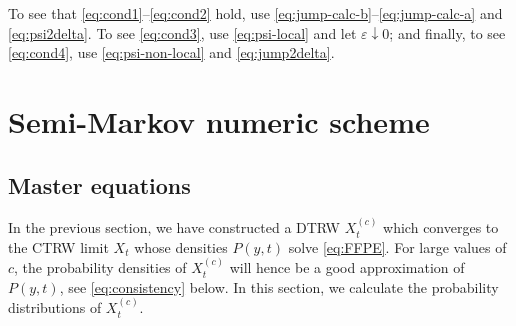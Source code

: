 \documentclass[a4paper,12pt]{elsarticle}
\numberwithin{equation}{section}
\theoremstyle{plain}
\theoremstyle{definition}
\theoremstyle{remark}
\numberwithin{equation}{section}
\newcommand{\1}{\mathbf 1}
\begin{document}
To see that \eqref{eq:cond1}--\eqref{eq:cond2} hold, use
\eqref{eq:jump-calc-b}--\eqref{eq:jump-calc-a} and \eqref{eq:psi2delta}. To see \eqref{eq:cond3}, use \eqref{eq:psi-local} and let $\varepsilon \downarrow 0$; and finally, to see \eqref{eq:cond4}, use \eqref{eq:psi-non-local} and \eqref{eq:jump2delta}.





\section{Semi-Markov numeric scheme}

\subsection{Master equations}

In the previous section, we have constructed a DTRW $X^{(c)}_t$ which  converges to the CTRW limit $X_t$ whose densities $P(y,t)$ solve \eqref{eq:FFPE}.  For large values of $c$, the probability densities of $X^{(c)}_t$ will hence be a good approximation of $P(y,t)$, see \eqref{eq:consistency} below.
In this section, we calculate the probability distributions of $X^{(c)}_t$.
\end{document}
